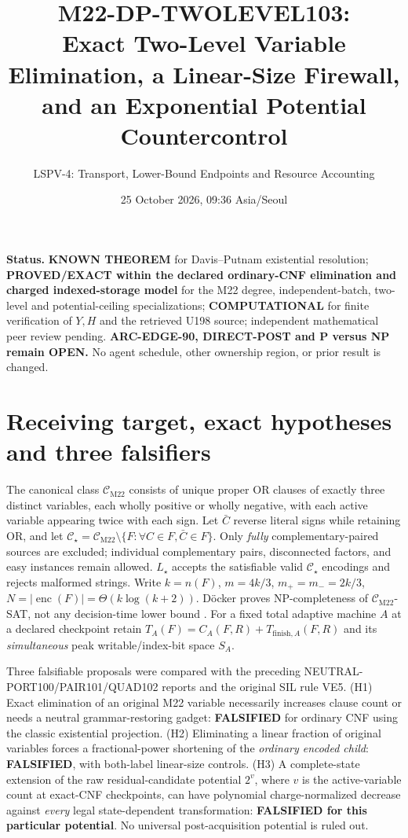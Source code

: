 \documentclass[11pt]{article}
\title{M22-DP-TWOLEVEL103:\\ Exact Two-Level Variable Elimination, a Linear-Size Firewall, and an Exponential Potential Countercontrol}
\author{LSPV-4: Transport, Lower-Bound Endpoints and Resource Accounting}
\date{25 October 2026, 09:36 Asia/Seoul}
\newcommand{\CM}{\mathcal C_{\mathrm{M22}}}
\newcommand{\CS}{\mathcal C_\star}
\begin{document}
\maketitle
\noindent\textbf{Status.} \textbf{KNOWN THEOREM} for Davis--Putnam existential resolution;
\textbf{PROVED/EXACT within the declared ordinary-CNF elimination and charged indexed-storage model}
for the M22 degree, independent-batch, two-level and potential-ceiling specializations;
\textbf{COMPUTATIONAL} for finite verification of \(Y,H\) and the retrieved U198 source;
independent mathematical peer review pending.
\textbf{ARC-EDGE-90, DIRECT-POST and P versus NP remain OPEN.}
No agent schedule, other ownership region, or prior result is changed.

\section{Receiving target, exact hypotheses and three falsifiers}
The canonical class \(\CM\) consists of unique proper OR clauses of exactly three
distinct variables, each wholly positive or wholly negative, with each active
variable appearing twice with each sign. Let \(\bar C\) reverse literal signs
while retaining OR, and let
\(\CS=\CM\setminus\{F:\forall C\in F,\bar C\in F\}\).
Only \emph{fully} complementary-paired sources are excluded; individual
complementary pairs, disconnected factors, and easy instances remain allowed.
\(L_\star\) accepts the satisfiable valid \(\CS\) encodings and rejects malformed strings.
Write \(k=n(F)\), \(m=4k/3\), \(m_+=m_-=2k/3\),
\(N=|\operatorname{enc}(F)|=\Theta(k\log(k+2))\).
D\"ocker proves NP-completeness of \(\CM\)-SAT, not any decision-time lower bound
\cite{docker}. For a fixed total adaptive machine \(A\) at a declared
checkpoint retain \(T_A(F)=C_A(F,R)+T_{\mathrm{finish},A}(F,R)\) and its
\emph{simultaneous} peak writable/index-bit space \(S_A\).

Three falsifiable proposals were compared with the preceding
NEUTRAL-PORT100/PAIR101/QUAD102 reports and the original SIL rule VE5.
(H1) Exact elimination of an original M22 variable necessarily increases
clause count or needs a neutral grammar-restoring gadget: \textbf{FALSIFIED}
for ordinary CNF using the classic existential projection.
(H2) Eliminating a linear fraction of original variables forces a
fractional-power shortening of the \emph{ordinary encoded child}:
\textbf{FALSIFIED}, with both-label linear-size controls.
(H3) A complete-state extension of the raw residual-candidate potential
\(2^{v}\), where \(v\) is the active-variable count at exact-CNF
checkpoints, can have polynomial charge-normalized decrease against
\emph{every} legal state-dependent transformation:
\textbf{FALSIFIED for this particular potential}. No universal
post-acquisition potential is ruled out.
\end{document}
